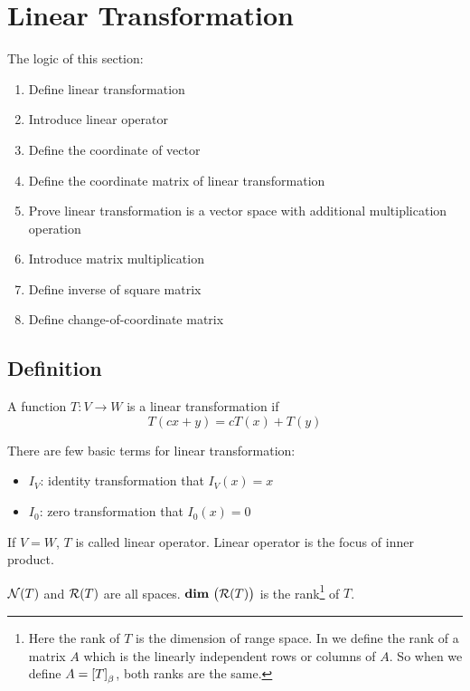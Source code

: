 
\chapter{Linear Transformation}

The logic of this section:
\begin{enumerate}
    \item Define linear transformation
    \item Introduce linear operator
    \item Define the coordinate of vector
    \item Define the coordinate matrix of linear transformation
    \item Prove linear transformation is a vector space with additional multiplication operation
    \item Introduce matrix multiplication
    \item Define inverse of square matrix
    \item Define change-of-coordinate matrix
\end{enumerate}

\section{Definition}

\begin{definition}
    A function $T:V \rightarrow W$ is a linear transformation if 
    \begin{equation}
        T(cx + y) = cT(x) + T(y)
    \end{equation}
\end{definition}

There are few basic terms for linear transformation:
\begin{itemize}
    \item $I_V$: identity transformation that $I_V (x) = x$
    \item $I_0$: zero transformation that $I_0 (x) = 0$
\end{itemize}



\begin{definition}
    If $V = W$, $T$ is called linear operator. Linear operator is the focus of inner product.
\end{definition}


\begin{definition}\label{rank-of-linear-transformation}
    $\nullspace{T}$ and $\rangespace{T}$ are all spaces. $\dimension{\rangespace{T}}$ is the rank\footnote{Here the rank of $T$ is the dimension of range space. In  we define the rank of a matrix $A$ which is the linearly independent rows or columns of $A$. So when we define $A = \coordinate{T}_\beta$, both ranks are the same.} of $T$.
\end{definition}



